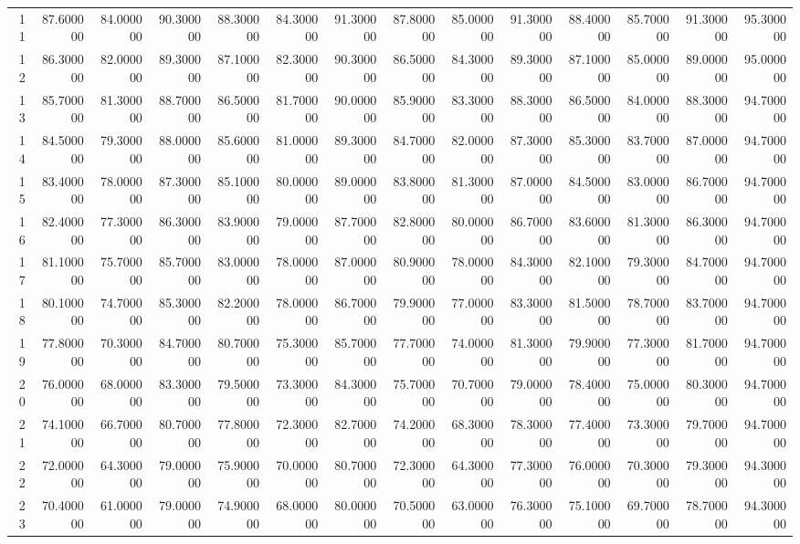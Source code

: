 \begin{tabular}{rrrrrrrrrrrrrr}
11 & 87.600000 & 84.000000 & 90.300000 & 88.300000 & 84.300000 & 91.300000 & 87.800000 & 85.000000 & 91.300000 & 88.400000 & 85.700000 & 91.300000 & 95.300000 \\
12 & 86.300000 & 82.000000 & 89.300000 & 87.100000 & 82.300000 & 90.300000 & 86.500000 & 84.300000 & 89.300000 & 87.100000 & 85.000000 & 89.000000 & 95.000000 \\
13 & 85.700000 & 81.300000 & 88.700000 & 86.500000 & 81.700000 & 90.000000 & 85.900000 & 83.300000 & 88.300000 & 86.500000 & 84.000000 & 88.300000 & 94.700000 \\
14 & 84.500000 & 79.300000 & 88.000000 & 85.600000 & 81.000000 & 89.300000 & 84.700000 & 82.000000 & 87.300000 & 85.300000 & 83.700000 & 87.000000 & 94.700000 \\
15 & 83.400000 & 78.000000 & 87.300000 & 85.100000 & 80.000000 & 89.000000 & 83.800000 & 81.300000 & 87.000000 & 84.500000 & 83.000000 & 86.700000 & 94.700000 \\
16 & 82.400000 & 77.300000 & 86.300000 & 83.900000 & 79.000000 & 87.700000 & 82.800000 & 80.000000 & 86.700000 & 83.600000 & 81.300000 & 86.300000 & 94.700000 \\
17 & 81.100000 & 75.700000 & 85.700000 & 83.000000 & 78.000000 & 87.000000 & 80.900000 & 78.000000 & 84.300000 & 82.100000 & 79.300000 & 84.700000 & 94.700000 \\
18 & 80.100000 & 74.700000 & 85.300000 & 82.200000 & 78.000000 & 86.700000 & 79.900000 & 77.000000 & 83.300000 & 81.500000 & 78.700000 & 83.700000 & 94.700000 \\
19 & 77.800000 & 70.300000 & 84.700000 & 80.700000 & 75.300000 & 85.700000 & 77.700000 & 74.000000 & 81.300000 & 79.900000 & 77.300000 & 81.700000 & 94.700000 \\
20 & 76.000000 & 68.000000 & 83.300000 & 79.500000 & 73.300000 & 84.300000 & 75.700000 & 70.700000 & 79.000000 & 78.400000 & 75.000000 & 80.300000 & 94.700000 \\
21 & 74.100000 & 66.700000 & 80.700000 & 77.800000 & 72.300000 & 82.700000 & 74.200000 & 68.300000 & 78.300000 & 77.400000 & 73.300000 & 79.700000 & 94.700000 \\
22 & 72.000000 & 64.300000 & 79.000000 & 75.900000 & 70.000000 & 80.700000 & 72.300000 & 64.300000 & 77.300000 & 76.000000 & 70.300000 & 79.300000 & 94.300000 \\
23 & 70.400000 & 61.000000 & 79.000000 & 74.900000 & 68.000000 & 80.000000 & 70.500000 & 63.000000 & 76.300000 & 75.100000 & 69.700000 & 78.700000 & 94.300000 \\

\end{tabular}
